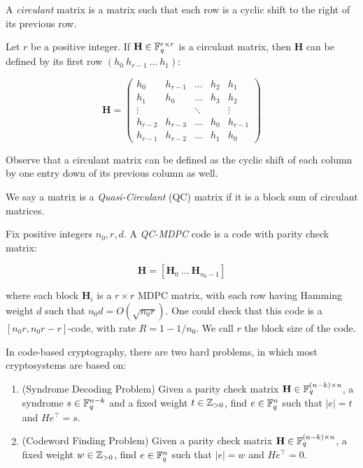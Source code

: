\begin{defn}
A \textit{circulant} matrix is a matrix such that each row is a cyclic shift to the right of its previous row. 

Let $r$ be a positive integer. If $\mathbf{H} \in \mathbb{F}_q^{r \times r}$ is a circulant matrix, then $\mathbf{H}$ can be defined by its first row $( h_0 \ h_{r-1} \ \ldots \ h_1)$:

\[
\mathbf{H} = \begin{pmatrix}
h_0 & h_{r-1} & \ldots & h_2 & h_1 \\
h_1 & h_0 & \ldots & h_3 & h_2 \\
\vdots &  & \ddots & & \vdots \\
h_{r-2} & h_{r-3} & \ldots & h_0 & h_{r-1} \\
h_{r-1} & h_{r-2} & \ldots & h_1 & h_0 
\end{pmatrix}
\]

Observe that a circulant matrix can be defined as the cyclic shift of each column by one entry down of its previous column as well.

We say a matrix is a \textit{Quasi-Circulant} (QC) matrix if it is a block sum of circulant matrices.
\end{defn}

\begin{defn}
Fix positive integers $n_0,r,d$. A \textit{QC-MDPC} code is a code with parity check matrix:

\[
\mathbf{H} = [ \mathbf{H}_0 \  \ldots \ \mathbf{H}_{n_0 -1} ] 
\]

where each block $\mathbf{H}_i$ is a $r \times r$ MDPC matrix, with each row having Hamming weight $d$ such that $n_0d = O(\sqrt{n_0 r})$. One could check that this code is a $[n_0 r, n_0 r - r]$-code, with rate $R = 1 - 1/n_0$. We call $r$ the block size of the code.
\end{defn}

In code-based cryptography, there are two hard problems, in which most cryptosystems are based on:

\begin{enumerate}
\item (Syndrome Decoding Problem) Given a parity check matrix $\mathbf{H} \in \mathbb{F}_q^{(n-k) \times n }$, a syndrome $s \in \mathbb{F}_q^{n-k}$ and a fixed weight $t \in \mathbb{Z}_{>0}$, find $e \in \mathbb{F}_q^n$ such that $|e| = t$ and $He^\top = s$.
\item (Codeword Finding Problem) Given a parity check matrix $\mathbf{H} \in \mathbb{F}_q^{(n-k) \times n }$, a fixed weight $w \in \mathbb{Z}_{>0}$, find $e \in \mathbb{F}_q^n$ such that $|e| = w$ and $He^\top = 0$.
\end{enumerate}

